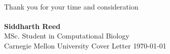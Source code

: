 \documentclass[11pt, a4paper]{./Awesome-CV/awesome-cv}
\begin{document}
\makecvheader[C] %
\vspace{1.2in}
\makelettertitle %

\begin{cvletter}
\vspace{1.3in}
\end{cvletter}
\\ Thank you for your time and consideration\\\\
\textbf{Siddharth Reed}\\
MSc. Student in Computational Biology \\
Carnegie Mellon University
 {Cover Letter} {\today}%
\end{document}
